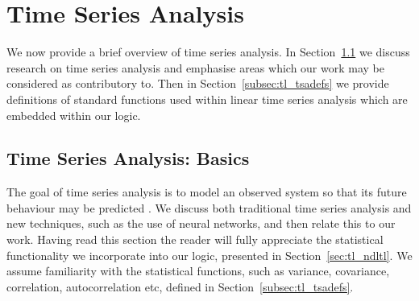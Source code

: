 \section{Time Series Analysis}\label{sec:tl_tsa}
We now provide a brief overview of time series analysis. In
Section~\ref{subsec:tl_tsabasic} we discuss research on time series
analysis and emphasise areas which our work may be considered as
contributory to. Then in Section~\ref{subsec:tl_tsadefs} we provide
definitions of standard functions used within linear time series
analysis which are embedded within our logic.

\subsection{Time Series Analysis: Basics}\label{subsec:tl_tsabasic}

The goal of time series analysis is to model an observed system so
that its future behaviour may be predicted \cite{wg94}. We discuss
both traditional time series analysis and new techniques, such as the
use of neural networks, and then relate this to our work. Having read
this section the reader will fully appreciate the statistical
functionality we incorporate into our logic, presented in
Section~\ref{sec:tl_ndltl}. We assume familiarity with the statistical
functions, such as variance, covariance, correlation, autocorrelation
etc, defined in Section~\ref{subsec:tl_tsadefs}.

\medskip

